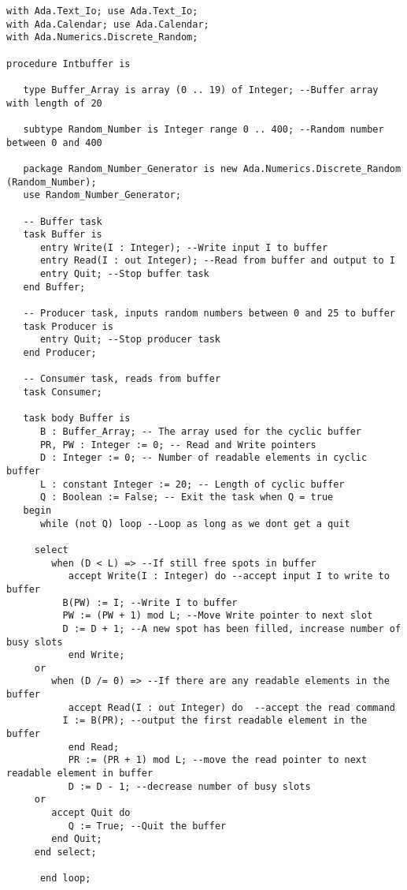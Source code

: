 \documentclass[a4paper,10pt]{article}
\begin{document}
\begin{lstlisting}
with Ada.Text_Io; use Ada.Text_Io;
with Ada.Calendar; use Ada.Calendar;
with Ada.Numerics.Discrete_Random;

procedure Intbuffer is
   
   type Buffer_Array is array (0 .. 19) of Integer; --Buffer array with length of 20
   
   subtype Random_Number is Integer range 0 .. 400; --Random number between 0 and 400
   
   package Random_Number_Generator is new Ada.Numerics.Discrete_Random (Random_Number);
   use Random_Number_Generator;
   
   -- Buffer task
   task Buffer is
      entry Write(I : Integer); --Write input I to buffer
      entry Read(I : out Integer); --Read from buffer and output to I
      entry Quit; --Stop buffer task
   end Buffer;
   
   -- Producer task, inputs random numbers between 0 and 25 to buffer
   task Producer is 
      entry Quit; --Stop producer task
   end Producer;   
   
   -- Consumer task, reads from buffer
   task Consumer;
   
   task body Buffer is
      B : Buffer_Array; -- The array used for the cyclic buffer
      PR, PW : Integer := 0; -- Read and Write pointers
      D : Integer := 0; -- Number of readable elements in cyclic buffer
      L : constant Integer := 20; -- Length of cyclic buffer
      Q : Boolean := False; -- Exit the task when Q = true
   begin
      while (not Q) loop --Loop as long as we dont get a quit
	 
	 select 
	    when (D < L) => --If still free spots in buffer
	       accept Write(I : Integer) do --accept input I to write to buffer
		  B(PW) := I; --Write I to buffer
		  PW := (PW + 1) mod L; --Move Write pointer to next slot
		  D := D + 1; --A new spot has been filled, increase number of busy slots
	       end Write;
	 or
	    when (D /= 0) => --If there are any readable elements in the buffer
	       accept Read(I : out Integer) do	--accept the read command	  
		  I := B(PR); --output the first readable element in the buffer	  
	       end Read;
	       PR := (PR + 1) mod L; --move the read pointer to next readable element in buffer      
	       D := D - 1; --decrease number of busy slots
	 or 
	    accept Quit do
	       Q := True; --Quit the buffer
	    end Quit;
	 end select;
	 
      end loop;
      

\end{lstlisting}
\end{document}
